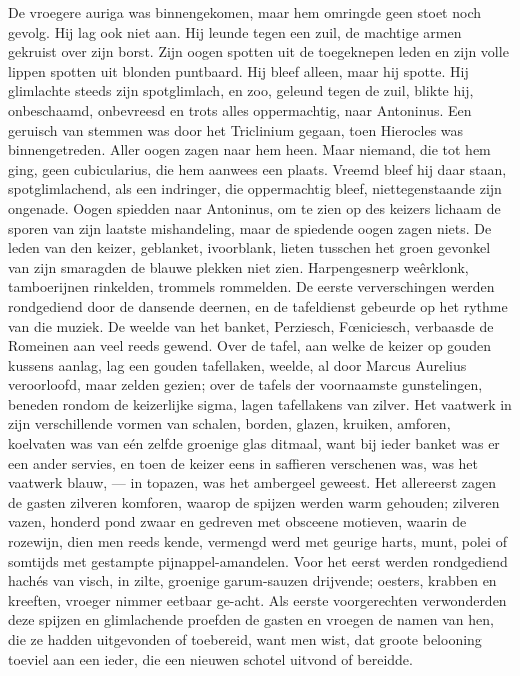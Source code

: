\documentclass[a4paper, 12pt, oneside, dutch]{article}
\begin{document}
De vroegere auriga was binnengekomen, maar hem omringde geen stoet noch gevolg. Hij lag ook niet aan. Hij leunde tegen een zuil, de machtige armen gekruist over zijn borst. Zijn oogen spotten uit de toegeknepen leden en zijn volle lippen spotten uit blonden puntbaard. Hij bleef alleen, maar hij spotte. Hij glimlachte steeds zijn spotglimlach, en zoo, geleund tegen de zuil, blikte hij, onbeschaamd, onbevreesd en trots alles oppermachtig, naar Antoninus. Een geruisch van stemmen was door het Triclinium gegaan, toen Hierocles was binnengetreden. Aller oogen zagen naar hem heen. Maar niemand, die tot hem ging, geen cubicularius, die hem aanwees een plaats. Vreemd bleef hij daar staan, spotglimlachend, als een indringer, die oppermachtig bleef, niettegenstaande zijn ongenade. Oogen spiedden naar Antoninus, om te zien op des keizers lichaam de sporen van zijn laatste mishandeling, maar de spiedende oogen zagen niets. De leden van den keizer, geblanket, ivoorblank, lieten tusschen het groen gevonkel van zijn smaragden de blauwe plekken niet zien. Harpengesnerp weêrklonk, tamboerijnen rinkelden, trommels rommelden. De eerste ververschingen werden rondgediend door de dansende deernen, en de tafeldienst gebeurde op het rythme van die muziek. De weelde van het banket, Perziesch, Fœniciesch, verbaasde de Romeinen aan veel reeds gewend. Over de tafel, aan welke de keizer op gouden kussens aanlag, lag een gouden tafellaken, weelde, al door Marcus Aurelius veroorloofd, maar zelden gezien; over de tafels der voornaamste gunstelingen, beneden rondom de keizerlijke sigma, lagen tafellakens van zilver. Het vaatwerk in zijn verschillende vormen van schalen, borden, glazen, kruiken, amforen, koelvaten was van eén zelfde groenige glas ditmaal, want bij ieder banket was er een ander servies, en toen de keizer eens in saffieren verschenen was, was het vaatwerk blauw, --- in topazen, was het ambergeel geweest. Het allereerst zagen de gasten zilveren komforen, waarop de spijzen werden warm gehouden; zilveren vazen, honderd pond zwaar en gedreven met obsceene motieven, waarin de rozewijn, dien men reeds kende, vermengd werd met geurige harts, munt, polei of somtijds met gestampte pijnappel-amandelen. Voor het eerst werden rondgediend hachés van visch, in zilte, groenige garum-sauzen drijvende; oesters, krabben en kreeften, vroeger nimmer eetbaar ge-acht. Als eerste voorgerechten verwonderden deze spijzen en glimlachende proefden de gasten en vroegen de namen van hen, die ze hadden uitgevonden of toebereid, want men wist, dat groote belooning toeviel aan een ieder, die een nieuwen schotel uitvond of bereidde.
\end{document}
